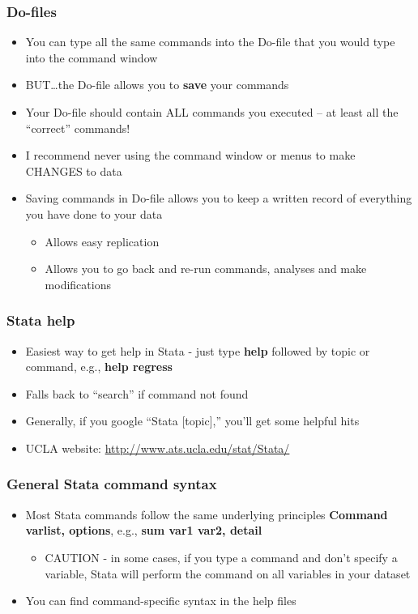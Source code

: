 \documentclass[table]{beamer}
\begin{document}
\begin{frame}
\frametitle{Do-files}
\label{sec-1-6}


\begin{itemize}
\item You can type all the same commands into the Do-file that you would type into the command window
\item BUT\ldots{}the Do-file allows you to \textbf{save} your commands
\item Your Do-file should contain ALL commands you executed -- at least all the ``correct'' commands!
\item I recommend never using the command window or menus to make CHANGES to data
\item Saving commands in Do-file allows you to keep a written record of everything you have done to your data
\begin{itemize}
\item Allows easy replication
\item Allows you to go back and re-run commands,  analyses and make modifications
\end{itemize}
\end{itemize}
\end{frame}
\begin{frame}
\frametitle{Stata help}
\label{sec-1-7}

\begin{itemize}
\item Easiest way to get help in Stata - just type \textbf{help} followed by topic or command, e.g., 
  \textbf{help regress}
\item Falls back to ``search'' if command not found
\item Generally, if you google ``Stata [topic],'' you'll get some helpful hits
\item UCLA website:
  \href{http://www.ats.ucla.edu/stat/Stata/}{http://www.ats.ucla.edu/stat/Stata/}
\end{itemize}
\end{frame}
\begin{frame}
\frametitle{General Stata command syntax}
\label{sec-1-8}

\begin{itemize}
\item Most Stata commands follow the same underlying principles
  \textbf{Command varlist, options}, e.g., \textbf{sum var1 var2, detail}
\begin{itemize}
\item CAUTION - in some cases, if you type a command and don't specify a variable, Stata will perform the command on all variables in your dataset
\end{itemize}
\item You can find command-specific syntax in the help files
\end{itemize}
\end{frame}
\end{document}
